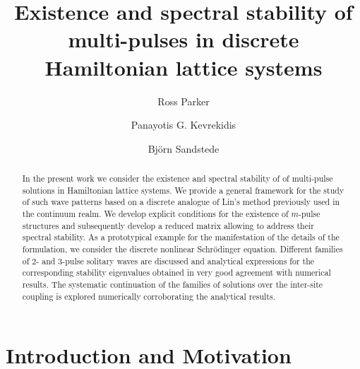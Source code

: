 \documentclass[12pt]{elsarticle}
\begin{document}
\begin{frontmatter}

\title{Existence and spectral stability of multi-pulses in discrete Hamiltonian lattice systems}

\author[1]{Ross Parker}
\author[2]{Panayotis G. Kevrekidis} 
\author[3]{Bj\"{o}rn Sandstede}

\address[1]{Division of Applied Mathematics, Brown University, Providence, RI 02912}
\address[2]{Department of Mathematics and Statistics, Lederle Graduate Research Tower, University of Massachusetts, Amherst, MA 01003}
\address[3]{Division of Applied Mathematics, Brown University, Providence, RI 02912}

\begin{abstract}
    In the present work we consider the existence and spectral stability of  
    of multi-pulse solutions in Hamiltonian lattice systems.
    We provide a general framework for the study
    of such wave patterns based on a discrete
    analogue of Lin's method previously used in
    the continuum realm. We develop explicit conditions
    for the existence of $m$-pulse structures and
    subsequently develop a reduced matrix allowing to
    address their spectral stability. As a prototypical
    example for the manifestation of the details of
    the formulation, we consider the discrete nonlinear
    Schr{\"o}dinger equation. Different families
    of $2$- and $3$-pulse solitary waves are discussed
    and analytical expressions for the corresponding 
    stability eigenvalues obtained in very good agreement
    with numerical results. The systematic continuation of
    the families of solutions over the inter-site coupling is explored numerically 
    corroborating the analytical results.
    \end{abstract}

\end{frontmatter}

\section{Introduction and Motivation}
\end{document}
